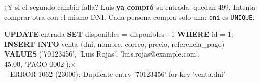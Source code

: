 \documentclass[aspectratio=169,10pt,c]{beamer}
\newcommand{\kw}[1]{\textcolor{utpRojo}{\textbf{#1}}}
\newcommand{\npieza}[1]{\tikz[baseline=-0.6ex]{\node[circle,fill=utpRojo,text=white,
  font=\bfseries\scriptsize,inner sep=1.6pt,minimum size=4.2mm] {#1};}}
\newcommand{\mal}[1]{{\setlength{\fboxsep}{1.2pt}\colorbox{utpRojo!18}{#1}}}
\newcommand{\no}{\textcolor{utpRojo}{$\times$}}
\newenvironment{sqlcode}[1][.86\textwidth]
  {\begin{center}\begin{lrbox}{\sqlbuf}\begin{minipage}{#1}\ttfamily\footnotesize\vspace{6pt}\raggedright}
  {\vspace{6pt}\end{minipage}\end{lrbox}\colorbox{utpGrisClaro}{\usebox{\sqlbuf}}\end{center}}
\newcommand{\ind}{\hspace*{1.2em}}
\newcommand{\err}[1]{\textcolor{utpRojo}{#1}}
\begin{document}
\begin{frame}{¿Y si el segundo cambio falla?}
\small Luis \textbf{ya compró} su entrada: quedan 499. Intenta comprar otra con el mismo DNI. Cada persona compra solo una: \texttt{dni} es \texttt{UNIQUE}.
\vspace{0.2cm}
\begin{sqlcode}[.9\textwidth]
\kw{UPDATE} entrada \kw{SET} disponibles = disponibles - 1 \kw{WHERE} id = 1;\hfill\textcolor{utpRojo}{\checkmark}\\[3pt]
\kw{INSERT INTO} venta (dni, nombre, correo, precio, referencia\_pago)\\
\kw{VALUES} (\mal{'70123456'}, 'Luis Rojas', 'luis.rojas@example.com',\\
\ind 45.00, 'PAGO-0002');\hfill\no\\[3pt]
\scriptsize\err{-- ERROR 1062 (23000): Duplicate entry '70123456' for key 'venta.dni'}
\end{sqlcode}
\vspace{0.1cm}
\begin{center}
\end{center}
\vspace{0.2cm}
\end{frame}
\end{document}

